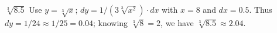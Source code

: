 {$\sqrt[3]{8.5}$
}
{Use $y = \sqrt[3]{x}$; $dy = 1/(3\sqrt[3]{x^2})\cdot dx$ with $x=8$ and $dx = 0.5$. Thus $dy = 1/24\approx 1/25=0.04$; knowing $\sqrt[3]{8}=2$, we have $\sqrt[3]{8.5} \approx 2.04$.
}

